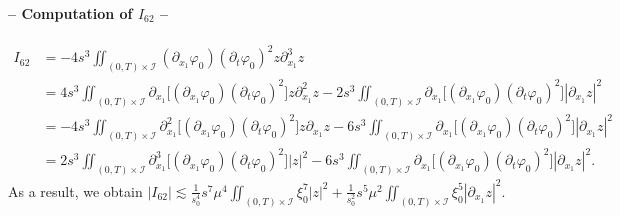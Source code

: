 \documentclass[a4paper, 12pt]{article}
\theoremstyle{plain}
\theoremstyle{definition}
\numberwithin{theorem}{section}
\numberwithin{equation}{section}
\begin{document}
{\paragraph{-- Computation of $I_{62}$ --}
\begin{align*}
I_{62}&=-4s^3\iint_{(0,T)\times\mathcal{I}}(\partial_{x_1}\varphi_0)(\partial_t\varphi_0)^2z\partial^3_{x_1}z\\
&=4s^3\iint_{(0,T)\times\mathcal{I}}\partial_{x_1}\big[(\partial_{x_1}\varphi_0)(\partial_t\varphi_0)^2\big]z\partial^2_{x_1}z-2s^3\iint_{(0,T)\times\mathcal{I}}\partial_{x_1}\big[(\partial_{x_1}\varphi_0)(\partial_t\varphi_0)^2\big]|\partial_{x_1}z|^2\\
&=-4s^3\iint_{(0,T)\times\mathcal{I}}\partial^2_{x_1}\big[(\partial_{x_1}\varphi_0)(\partial_t\varphi_0)^2\big]z\partial_{x_1}z-6s^3\iint_{(0,T)\times\mathcal{I}}\partial_{x_1}\big[(\partial_{x_1}\varphi_0)(\partial_t\varphi_0)^2\big]|\partial_{x_1}z|^2\\
&=2s^3\iint_{(0,T)\times\mathcal{I}}\partial^3_{x_1}\big[(\partial_{x_1}\varphi_0)(\partial_t\varphi_0)^2\big]|z|^2-6s^3\iint_{(0,T)\times\mathcal{I}}\partial_{x_1}\big[(\partial_{x_1}\varphi_0)(\partial_t\varphi_0)^2\big]|\partial_{x_1}z|^2.
\end{align*}
As a result, we obtain
$ \displaystyle
|I_{62}|\lesssim \frac{1}{s_0^4}s^7\mu^4\iint_{(0,T)\times\mathcal{I}}\xi_0^7|z|^2+\frac{1}{s_0^2}s^5\mu^2\iint_{(0,T)\times\mathcal{I}}\xi_0^5|\partial_{x_1}z|^2.
$
}
\end{document}
